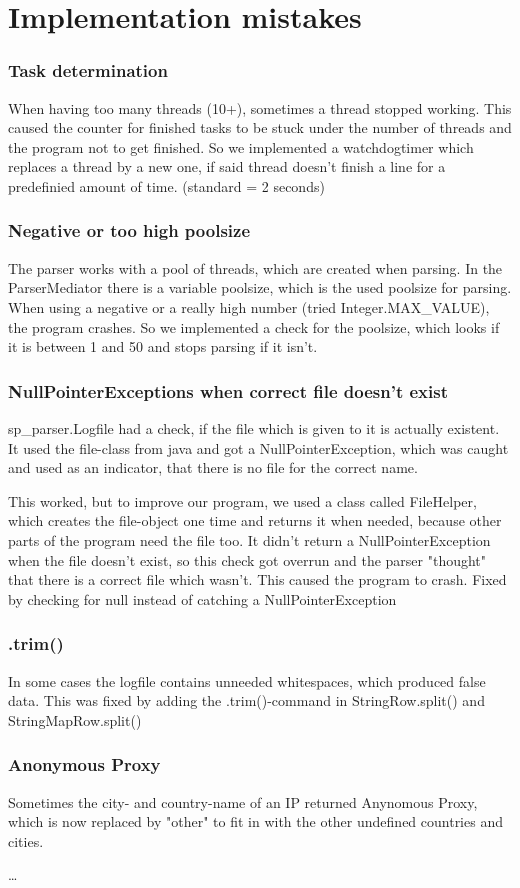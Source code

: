 \section{Implementation mistakes}

\subsubsection{Task determination}
When having too many threads (10+), sometimes a thread stopped working. This caused the counter for finished tasks
to be stuck under the number of threads and the program not to get finished.
So we implemented a watchdogtimer which replaces a thread by a new one, if said thread doesn't finish a line for a 
predefinied amount of time. (standard = 2 seconds)

\subsubsection{Negative or too high poolsize}
The parser works with a pool of threads, which are created when parsing. In the ParserMediator there is
a variable poolsize, which is the used poolsize for parsing.
When using a negative or a really high number (tried Integer.MAX_VALUE), the program crashes.
So we implemented a check for the poolsize, which looks if it is between 1 and 50 and stops parsing if it isn't.

\subsubsection{NullPointerExceptions when correct file doesn't exist}
sp_parser.Logfile had a check, if the file which is given to it is actually existent. It used the file-class from java
and got a NullPointerException, which was caught and used as an indicator, that there is no file for the correct name.

This worked, but to improve our program, we used a class called FileHelper, which creates the file-object one time and
returns it when needed, because other parts of the program need the file too. It didn't return a NullPointerException when 
the file doesn't exist, so this check got overrun and the parser "thought" that there is a correct file which wasn't.
This caused the program to crash. Fixed by checking for null instead of catching a NullPointerException

\subsubsection{.trim()}
In some cases the logfile contains unneeded whitespaces, which produced false data. This was fixed by adding the .trim()-command
in StringRow.split() and StringMapRow.split()

\subsubsection{Anonymous Proxy}
Sometimes the city- and country-name of an IP returned Anynomous Proxy, which is now replaced by "other" to fit in with 
the other undefined countries and cities.


\ldots
